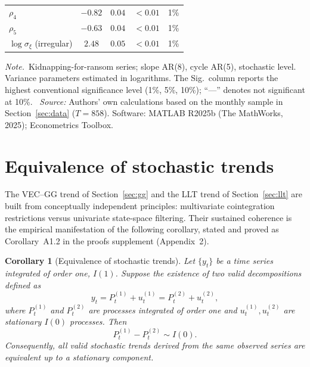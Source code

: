 \documentclass[ecta,nameyear,final,supplement]{econsocart}
\numberwithin{equation}{section}
\numberwithin{table}{section}
\newtheorem{corollary}[theorem]{Corollary}
\theoremstyle{definition}
\newcommand{\tabnote}{\par\addvspace{0.4em}\noindent\emph{Note.}}
\newcommand{\tabsource}{\ \textit{Source:} Authors' own calculations based on
the monthly sample in Section~\ref{sec:data} ($T=858$). Software: MATLAB
R2025b (The MathWorks, 2025); Econometrics Toolbox.}
\begin{document}
\begin{table}[t]
\begin{tabular}{lcccl}
$\rho_4$                       & $-0.82$ & $0.04$ & $<0.01$ & 1\% \\
$\rho_5$                       & $-0.63$ & $0.04$ & $<0.01$ & 1\% \\
$\log\sigma_\xi$ (irregular)   & $2.48$  & $0.05$ & $<0.01$ & 1\% \\
\bottomrule
\end{tabular}
\tabnote\ Kidnapping-for-ransom series; slope AR(8), cycle AR(5), stochastic
level. Variance parameters estimated in logarithms. The Sig.\ column reports
the highest conventional significance level (1\%, 5\%, 10\%); ``---'' denotes
not significant at 10\%.
\tabsource
\end{table}

\section{Equivalence of stochastic trends}
\label{sec:equivalence}

The VEC--GG trend of Section~\ref{sec:gg} and the LLT trend of
Section~\ref{sec:llt} are built from conceptually independent principles:
multivariate cointegration restrictions versus univariate state-space
filtering. Their sustained coherence is the empirical manifestation of the
following corollary, stated and proved as
Corollary~A1.2 in the proofs supplement (Appendix~2).

\begin{corollary}[Equivalence of stochastic trends]
\label{cor:equiv-trend}
Let $\{y_t\}$ be a time series integrated of order one, $I(1)$. Suppose the
existence of two valid decompositions defined as
\begin{equation*}
y_t = P_t^{(1)} + u_t^{(1)} = P_t^{(2)} + u_t^{(2)},
\end{equation*}
where $P_t^{(1)}$ and $P_t^{(2)}$ are processes integrated of order one and
$u_t^{(1)}, u_t^{(2)}$ are stationary $I(0)$ processes. Then
\begin{equation*}
P_t^{(1)} - P_t^{(2)} \sim I(0).
\end{equation*}
Consequently, all valid stochastic trends derived from the same observed
series are equivalent up to a stationary component.
\end{corollary}
\end{document}
